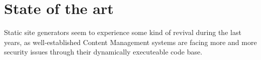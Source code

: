 \chapter{State of the art}
\label{cha:state-of-the-art}

Static site generators seem to experience some kind of revival during the last years, as well-established Content Management systems are facing more and more security issues through their dynamically executeable code base.



